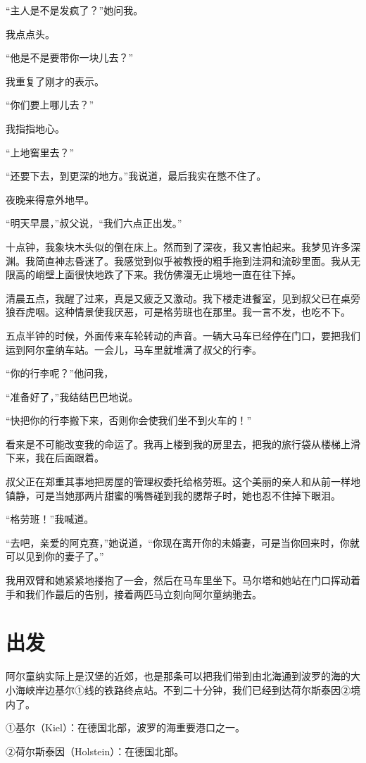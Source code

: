 \documentclass[10pt]{book}
\begin{document}
“主人是不是发疯了？”她问我。

我点点头。

“他是不是要带你一块儿去？”

我重复了刚才的表示。

“你们要上哪儿去？”

我指指地心。

“上地窖里去？”

“还要下去，到更深的地方。”我说道，最后我实在憋不住了。

夜晚来得意外地早。

“明天早晨，”叔父说，“我们六点正出发。”

十点钟，我象块木头似的倒在床上。然而到了深夜，我又害怕起来。我梦见许多深渊。我简直神志昏迷了。我感觉到似乎被教授的粗手拖到洼洞和流砂里面。我从无限高的峭壁上面很快地跌了下来。我仿佛漫无止境地一直在往下掉。

清晨五点，我醒了过来，真是又疲乏又激动。我下楼走进餐室，见到叔父已在桌旁狼吞虎咽。这种情景使我厌恶，可是格劳班也在那里。我一言不发，也吃不下。

五点半钟的时候，外面传来车轮转动的声音。一辆大马车已经停在门口，要把我们运到阿尔童纳车站。一会儿，马车里就堆满了叔父的行李。

“你的行李呢？”他问我，

“准备好了，”我结结巴巴地说。

“快把你的行李搬下来，否则你会使我们坐不到火车的！”

看来是不可能改变我的命运了。我再上楼到我的房里去，把我的旅行袋从楼梯上滑下来，我在后面跟着。

叔父正在郑重其事地把房屋的管理权委托给格劳班。这个美丽的亲人和从前一样地镇静，可是当她那两片甜蜜的嘴唇碰到我的腮帮子时，她也忍不住掉下眼泪。

“格劳班！”我喊道。

“去吧，亲爱的阿克赛，”她说道，“你现在离开你的未婚妻，可是当你回来时，你就可以见到你的妻子了。”

我用双臂和她紧紧地搂抱了一会，然后在马车里坐下。马尔塔和她站在门口挥动着手和我们作最后的告别，接着两匹马立刻向阿尔童纳驰去。
\chapter{出发}
阿尔童纳实际上是汉堡的近郊，也是那条可以把我们带到由北海通到波罗的海的大小海峡岸边基尔①线的铁路终点站。不到二十分钟，我们已经到达荷尔斯泰因②境内了。

①基尔（Kiel）：在德国北部，波罗的海重要港口之一。

②荷尔斯泰因（Holstein）：在德国北部。
\end{document}
